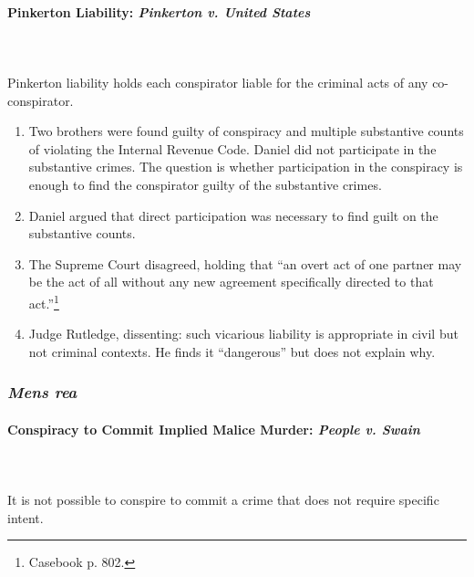 \paragraph{Pinkerton Liability: \emph{Pinkerton v. United States}}
~\\\\
Pinkerton liability holds each conspirator liable for the criminal acts of any 
co-conspirator.

\begin{enumerate}
    \item Two brothers were found guilty of conspiracy and multiple 
    substantive counts of violating the Internal Revenue Code. Daniel did not 
    participate in the substantive crimes. The question is whether 
    participation in the conspiracy is enough to find the conspirator guilty 
    of the substantive crimes.
    \item Daniel argued that direct participation was necessary to find guilt 
    on the substantive counts.
    \item The Supreme Court disagreed, holding that ``an overt act of one 
    partner may be the act of all without any new agreement specifically 
    directed to that act.''\footnote{Casebook p. 802.}
    \item Judge Rutledge, dissenting: such vicarious liability is appropriate 
    in civil but not criminal contexts. He finds it ``dangerous'' but does not 
    explain why.
\end{enumerate}

\subsubsection{\emph{Mens rea}}

\paragraph{Conspiracy to Commit Implied Malice Murder: \emph{People v. Swain}}
~\\\\
It is not possible to conspire to commit a crime that does not require 
specific intent.

